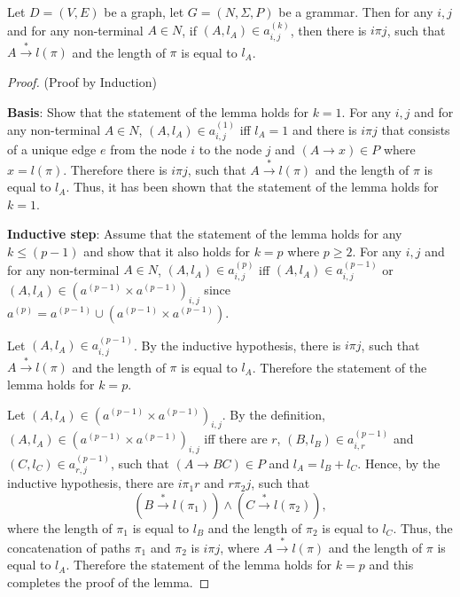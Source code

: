 \begin{lemma}\label{lemma:singlepath}
	Let $D = (V,E)$ be a graph, let $G =(N,\Sigma,P)$ be a grammar. Then for any $i, j$ and for any non-terminal $A \in N$, if $(A,l_A) \in a^{(k)}_{i,j}$, then there is $i \pi j$, such that $A \xrightarrow{*} l(\pi)$ and the length of $\pi$ is equal to $l_A$.
\end{lemma}
\begin{proof}(Proof by Induction)
	
	\textbf{Basis}: Show that the statement of the lemma holds for $k = 1$. For any $i, j$ and for any non-terminal $A \in N$, $(A, l_A) \in a^{(1)}_{i,j}$ iff $l_A = 1$ and there is $i \pi j$ that consists of a unique edge $e$ from the node $i$ to the node $j$ and $(A \rightarrow x) \in P$ where $x = l(\pi)$. Therefore there is $i \pi j$, such that $A \xrightarrow{*} l(\pi)$ and the length of $\pi$ is equal to $l_A$. Thus, it has been shown that the statement of the lemma holds for $k = 1$.
	
	\textbf{Inductive step}: Assume that the statement of the lemma holds for any $k \leq (p - 1)$ and show that it also holds for $k = p$ where $p \geq 2$. For any $i, j$ and for any non-terminal $A \in N$, $(A, l_A) \in a^{(p)}_{i,j}$ iff $(A, l_A) \in a^{(p-1)}_{i,j}$ or $(A, l_A) \in (a^{(p-1)} \times a^{(p-1)})_{i,j}$ since $a^{(p)} = a^{(p-1)} \cup (a^{(p-1)} \times a^{(p-1)}).$
	
	Let $(A, l_A) \in a^{(p-1)}_{i,j}$. By the inductive hypothesis, there is $i \pi j$, such that $A \xrightarrow{*} l(\pi)$ and the length of $\pi$ is equal to $l_A$. Therefore the statement of the lemma holds for $k = p$.
	
	Let $(A, l_A) \in (a^{(p-1)} \times a^{(p-1)})_{i,j}$. By the definition, $(A, l_A) \in (a^{(p-1)} \times a^{(p-1)})_{i,j}$ iff there are $r$, $(B, l_B) \in a^{(p-1)}_{i,r}$ and $(C, l_C) \in a^{(p-1)}_{r,j}$, such that $(A \rightarrow B C) \in P$ and $l_A = l_B + l_C$. Hence, by the inductive hypothesis, there are $i \pi_1 r$ and $r \pi_2 j$, such that $$(B \xrightarrow{*} l(\pi_1)) \wedge(C \xrightarrow{*} l(\pi_2)),$$ where the length of $\pi_1$ is equal to $l_B$ and the length of $\pi_2$ is equal to $l_C$. Thus, the concatenation of paths $\pi_1$ and $\pi_2$ is $i \pi j$, where $A \xrightarrow{*} l(\pi)$ and the length of $\pi$ is equal to $l_A$. Therefore the statement of the lemma holds for $k = p$ and this completes the proof of the lemma.
\end{proof}

